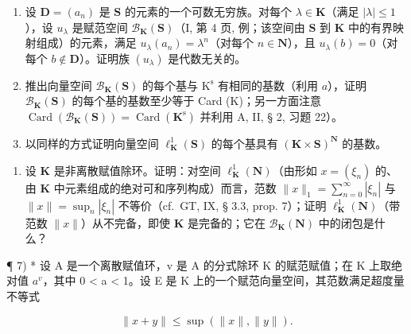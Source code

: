 \begin{enumerate}
\def\labelenumi{\alph{enumi})}
\item
  设 \(\mathbf{D} = (a_n)\) 是 \(\mathbf{S}\) 的元素的一个可数无穷族。对每个 \(\lambda \in \mathbf{K}\)（满足 \(|\lambda| \leqslant 1\)），设 \(u_{\lambda}\) 是赋范空间 \(\mathcal{B}_{\mathbf{K}}(\mathbf{S})\)（I, 第 4 页, 例；该空间由 \(\mathbf{S}\) 到 \(\mathbf{K}\) 中的有界映射组成）的元素，满足 \(u_{\lambda}(a_n) = \lambda^n\)（对每个 \(n \in \mathbf{N}\)），且 \(u_{\lambda}(b) = 0\)（对每个 \(b \notin \mathbf{D}\)）。证明族 \((u_{\lambda})\) 是代数无关的。
\item
  推出向量空间 \(\mathcal{B}_{\mathbf{K}}(\mathbf{S})\) 的每个基与 \(\mathrm{K}^{\mathrm{s}}\) 有相同的基数（利用 \(a\)），证明 \(\mathcal{B}_{\mathbf{K}}(\mathbf{S})\) 的每个基的基数至少等于 Card (K)；另一方面注意 \(\operatorname{Card}(\mathcal{B}_{\mathbf{K}}(\mathbf{S})) = \operatorname{Card}(\mathbf{K}^{\mathrm{s}})\) 并利用 A, II, § 2, 习题 22）。
\item
  以同样的方式证明向量空间 \(\ell_{\mathbf{K}}^{1}(\mathbf{S})\) 的每个基具有 \((\mathbf{K}\times \mathbf{S})^{\mathbf{N}}\) 的基数。
\end{enumerate}

\begin{enumerate}
\def\labelenumi{\arabic{enumi})}
\setcounter{enumi}{5}
\tightlist
\item
  设 \(\mathbf{K}\) 是非离散赋值除环。证明：对空间 \(\ell_{\mathbf{K}}^{1}(\mathbf{N})\)（由形如 \(x = (\xi_n)\) 的、由 \(\mathbf{K}\) 中元素组成的绝对可和序列构成）而言，范数 \(\| x \|_1 = \sum_{n=0}^{\infty} |\xi_n|\) 与 \(\| x \| = \sup_n |\xi_n|\) 不等价（cf.~GT, IX, § 3.3, prop. 7）；证明 \(\ell_{\mathbf{K}}^{1}(\mathbf{N})\)（带范数 \(\| x \|\)）从不完备，即使 \(\mathbf{K}\) 是完备的；它在 \(\mathcal{B}_{\mathbf{K}}(\mathbf{N})\) 中的闭包是什么？
\end{enumerate}

¶ 7) * 设 A 是一个离散赋值环，v 是 A 的分式除环 K 的赋范赋值；在 K 上取绝对值 \(a^{v}\)，其中 0 \textless{} a \textless{} 1。设 E 是 K 上的一个赋范向量空间，其范数满足超度量不等式

\[
\| x + y \| \leqslant \sup (\| x \|, \| y \|).
\]

